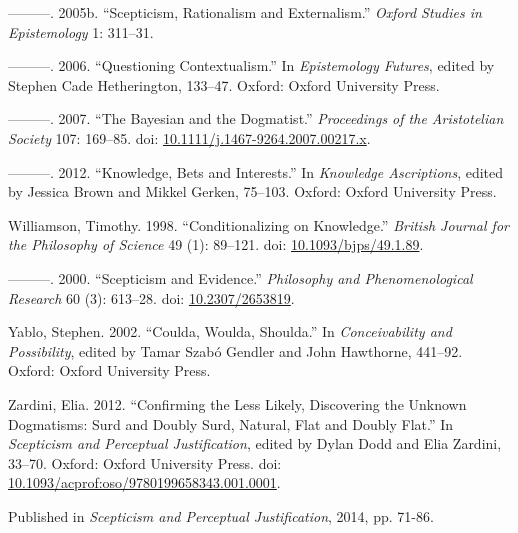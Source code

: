 \documentclass[
  10pt,
  letterpaper,
  DIV=11,
  numbers=noendperiod,
  twoside]{scrartcl}
\newlength{\cslhangindent}
\newenvironment{CSLReferences}[2] %
 {\begin{list}{}{%
  \setlength{\itemindent}{0pt}
  \setlength{\leftmargin}{0pt}
  \setlength{\parsep}{0pt}
  \ifodd #1
   \setlength{\leftmargin}{\cslhangindent}
   \setlength{\itemindent}{-1\cslhangindent}
  \fi
  \setlength{\itemsep}{#2\baselineskip}}}
 {\end{list}}
\begin{document}
\begin{CSLReferences}{1}{0}
---------. 2005b. {``Scepticism, Rationalism and Externalism.''}
\emph{Oxford Studies in Epistemology} 1: 311--31.

---------. 2006. {``Questioning Contextualism.''} In \emph{Epistemology
Futures}, edited by Stephen Cade Hetherington, 133--47. Oxford: Oxford
University Press.

---------. 2007. {``The Bayesian and the Dogmatist.''} \emph{Proceedings
of the Aristotelian Society} 107: 169--85. doi:
\href{https://doi.org/10.1111/j.1467-9264.2007.00217.x}{10.1111/j.1467-9264.2007.00217.x}.

---------. 2012. {``Knowledge, Bets and Interests.''} In \emph{Knowledge
Ascriptions}, edited by Jessica Brown and Mikkel Gerken, 75--103.
Oxford: Oxford University Press.

Williamson, Timothy. 1998. {``{Conditionalizing on Knowledge}.''}
\emph{British Journal for the Philosophy of Science} 49 (1): 89--121.
doi: \href{https://doi.org/10.1093/bjps/49.1.89}{10.1093/bjps/49.1.89}.

---------. 2000. {``{Scepticism and Evidence}.''} \emph{Philosophy and
Phenomenological Research} 60 (3): 613--28. doi:
\href{https://doi.org/10.2307/2653819}{10.2307/2653819}.

Yablo, Stephen. 2002. {``Coulda, Woulda, Shoulda.''} In
\emph{Conceivability and Possibility}, edited by Tamar Szabó Gendler and
John Hawthorne, 441--92. Oxford: Oxford University Press.

Zardini, Elia. 2012. {``Confirming the Less Likely, Discovering the
Unknown Dogmatisms: Surd and Doubly Surd, Natural, Flat and Doubly
Flat.''} In \emph{Scepticism and Perceptual Justification}, edited by
Dylan Dodd and Elia Zardini, 33--70. Oxford: Oxford University Press.
doi:
\href{https://doi.org/10.1093/acprof:oso/9780199658343.001.0001}{10.1093/acprof:oso/9780199658343.001.0001}.

\end{CSLReferences}



\noindent Published in\emph{
Scepticism and Perceptual Justification}, 2014, pp. 71-86.
\end{document}
